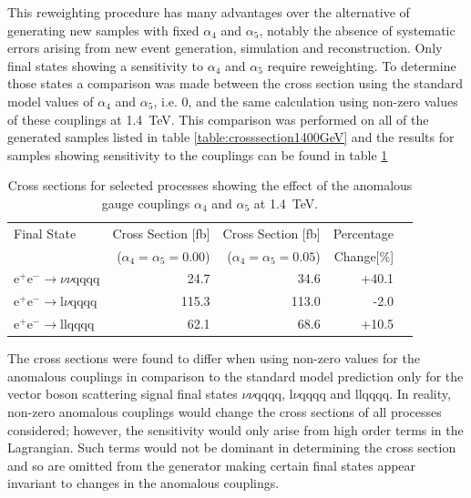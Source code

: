 This reweighting procedure has many advantages over the alternative of generating new samples with fixed $\alpha_{4}$ and $\alpha_{5}$, notably the absence of systematic errors arising from new event generation, simulation and reconstruction.  Only final states showing a sensitivity to $\alpha_{4}$ and $\alpha_{5}$ require reweighting.  To determine those states a comparison was made between the cross section using the standard model values of $\alpha_{4}$ and $\alpha_{5}$, i.e. 0, and the same calculation using non-zero values of these couplings at 1.4~TeV.  This comparison was performed on all of the generated samples listed in table \ref{table:crosssection1400GeV} and the results for samples showing sensitivity to the couplings can be found in table \ref{table:crosssectionsensitivity1400}

\begin{table}[h!]
\centering
\begin{tabular}{ l r r r r }
\hline
Final State & Cross Section [fb] & Cross Section [fb] & Percentage \\ 
& ($\alpha_{4} = \alpha_{5} = 0.00$) & ($\alpha_{4} = \alpha_{5} = 0.05$) & Change[\%] \\ 
\hline
$\text{e}^{+}\text{e}^{-} \rightarrow \nu{\nu}\text{qqqq}$ & 24.7 & 34.6 & +40.1 \\
$\text{e}^{+}\text{e}^{-} \rightarrow \text{l}{\nu}\text{qqqq}$ & 115.3 & 113.0 & -2.0 \\
$\text{e}^{+}\text{e}^{-} \rightarrow \text{llqqqq}$ & 62.1 & 68.6 & +10.5 \\
\hline
\end{tabular}
\caption[Cross sections for selected processes showing the effect of the anomalous gauge couplings $\alpha_{4}$ and $\alpha_{5}$ at 1.4~TeV.]{Cross sections for selected processes showing the effect of the anomalous gauge couplings $\alpha_{4}$ and $\alpha_{5}$ at 1.4~TeV.}
\label{table:crosssectionsensitivity1400}
\end{table}

The cross sections were found to differ when using non-zero values for the anomalous couplings in comparison to the standard model prediction only for the vector boson scattering signal final states $\nu\nu\text{qqqq}$, $\text{l}\nu\text{qqqq}$ and llqqqq.  In reality, non-zero anomalous couplings would change the cross sections of all processes considered; however, the sensitivity would only arise from high order terms in the Lagrangian.  Such terms would not be dominant in determining the cross section and so are omitted from the generator making certain final states appear invariant to changes in the anomalous couplings.

